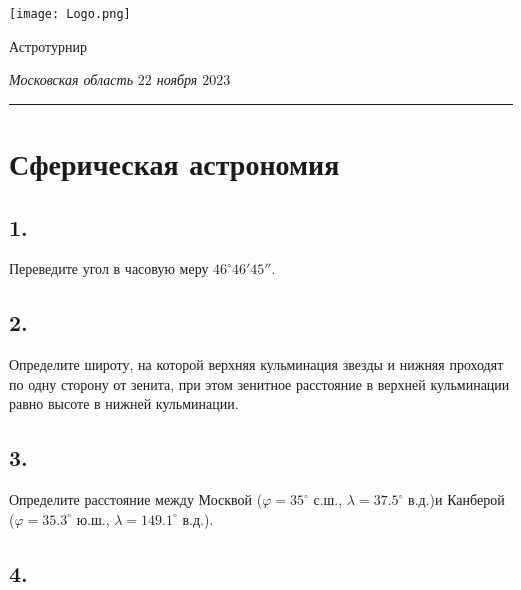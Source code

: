 \documentclass[a4paper,12pt]{article}
\begin{document}
	
	\begin{minipage}{0.15 \textwidth}
		\texttt{[image: Logo.png]}
	\end{minipage}
	\begin{minipage}{0.85 \textwidth}
		\begin{center}
			\begin{Huge}
				Астротурнир
			\end{Huge}
			
			\bigskip
			
			\begin{Large}
				\textit{Московская область} \hspace{25 pt}
				\textit{$22$ ноября $2023$}
			\end{Large}
			
		\end{center}
	\end{minipage}
	
	\bigskip
	
	\hrule
	
\section*{Сферическая астрономия}
	

\subsection*{1.}

Переведите угол в часовую меру $46^{\circ} 46' 45''$.

\subsection*{2. }

Определите широту, на которой верхняя кульминация звезды и нижняя проходят по одну сторону от зенита, при этом зенитное расстояние в верхней кульминации равно высоте в нижней кульминации.


\subsection*{3.}

Определите расстояние между Москвой ($\varphi = 35^{\circ}$ с.ш., $\lambda = 37.5^{\circ}$ в.д.)и  Канберой ($\varphi = 35.3^{\circ}$ ю.ш., $\lambda = 149.1^{\circ}$ в.д.).


\subsection*{4.}
\end{document}
